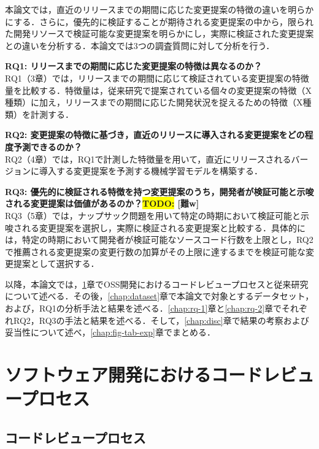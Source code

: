 \documentclass[submit,ses,noauthor]{ipsj}
\newcommand{\todo}[1]{\colorbox{yellow}{{\bf TODO}:}{\color{red} {\textbf{[#1]}}}}
\begin{document}
本論文では，直近のリリースまでの期間に応じた変更提案の特徴の違いを明らかにする．さらに，優先的に検証することが期待される変更提案の中から，限られた開発リソースで検証可能な変更提案を明らかにし，実際に検証された変更提案との違いを分析する．本論文では3つの調査質問に対して分析を行う．

\noindent\textbf{RQ1: リリースまでの期間に応じた変更提案の特徴は異なるのか？}\\
RQ1（3章）では，リリースまでの期間に応じて検証されている変更提案の特徴量を比較する．特徴量は，従来研究で提案されている個々の変更提案の特徴（X種類）に加え，リリースまでの期間に応じた開発状況を捉えるための特徴（X種類）を計測する．

\noindent\textbf{RQ2: 変更提案の特徴に基づき，直近のリリースに導入される変更提案をどの程度予測できるのか？}\\
RQ2（4章）では，RQ1で計測した特徴量を用いて，直近にリリースされるバージョンに導入する変更提案を予測する機械学習モデルを構築する．

\noindent\textbf{RQ3: 優先的に検証される特徴を持つ変更提案のうち，開発者が検証可能と示唆される変更提案は価値があるのか？\todo{難w}}\\
RQ3（5章）では，ナップサック問題を用いて特定の時期において検証可能と示唆される変更提案を選択し，実際に検証される変更提案と比較する．具体的には，特定の時期において開発者が検証可能なソースコード行数を上限とし，RQ2で推薦される変更提案の変更行数の加算がその上限に達するまでを検証可能な変更提案として選択する．

以降，本論文では，\ref{chap:intro}章でOSS開発におけるコードレビュープロセスと従来研究について述べる．その後，\ref{chap:dataset}章で本論文で対象とするデータセット，および，RQ1の分析手法と結果を述べる．\ref{chap:rq-1}章と\ref{chap:rq-2}章でそれぞれRQ2，RQ3の手法と結果を述べる．そして，\ref{chap:disc}章で結果の考察および妥当性について述べ，\ref{chap:fig-tab-exp}章でまとめる．

\section{ソフトウェア開発におけるコードレビュープロセス}\label{chap:intro}

\subsection{コードレビュープロセス}
\end{document}
